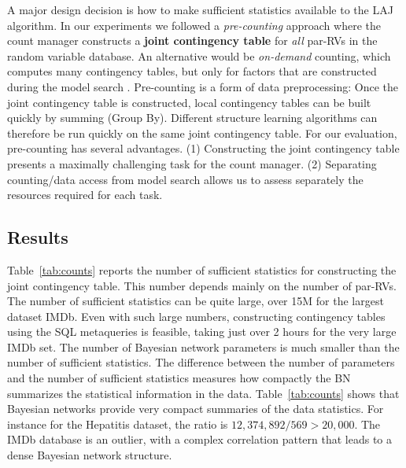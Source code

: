  A major design decision is how to make sufficient statistics available to the LAJ algorithm. In our experiments we followed a {\em pre-counting} approach where the count manager constructs a \textbf{joint contingency table} for {\em all} par-RVs in the random variable database. An alternative would be {\em on-demand} counting, which computes many contingency tables, but only for factors that are constructed during the model search \cite{Lv2012}.
Pre-counting is a form of data preprocessing: Once the joint contingency table is constructed, local contingency tables can be built quickly by summing (Group By). Different structure learning algorithms can therefore be run quickly on the same joint contingency table. 
%
For our evaluation, pre-counting has several advantages. (1) Constructing the joint contingency table presents a maximally challenging task for the count manager. (2) Separating counting/data access from model search allows us to assess separately the resources required for each task.



\subsection{Results}
Table~\ref{tab:counts} reports the number of sufficient statistics for constructing the joint contingency table. This number depends mainly on the number of par-RVs. The number of sufficient statistics can be quite large, over 15M for the largest dataset IMDb. 
Even with such large numbers, constructing contingency tables using the SQL metaqueries is feasible, taking just over 2 hours for the very large IMDb set. 
The number of Bayesian network parameters is much smaller than the number of sufficient statistics.
The difference between the number of parameters and the number of sufficient statistics measures how compactly the BN summarizes the statistical information in the data. %
Table~\ref{tab:counts} shows that Bayesian networks provide very compact summaries of the data statistics. For instance for the Hepatitis dataset, the ratio is  $12,374,892/569 > 20,000$. The IMDb database is an outlier, with a complex correlation pattern that leads to a dense Bayesian network structure.

